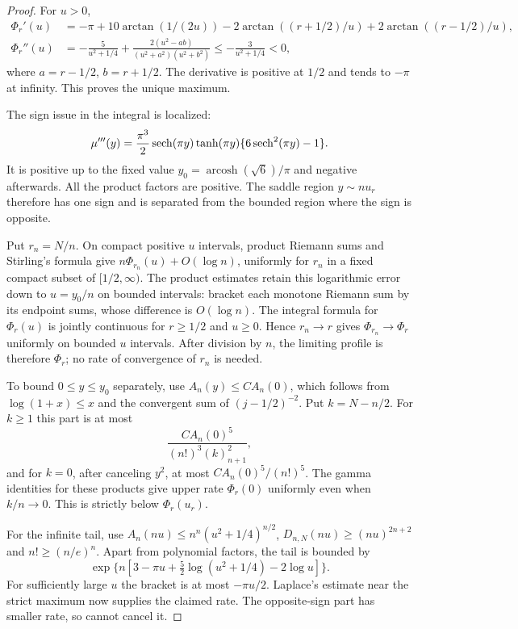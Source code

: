 \begin{proof}
For $u>0$,
\begin{align*}
 \Phi_r'(u)&=-\pi+10\arctan(1/(2u))
             -2\arctan((r+1/2)/u)+2\arctan((r-1/2)/u),\\
 \Phi_r''(u)&=-\frac5{u^2+1/4}
       +\frac{2(u^2-ab)}{(u^2+a^2)(u^2+b^2)}
       \le-\frac3{u^2+1/4}<0,
\end{align*}
where $a=r-1/2$, $b=r+1/2$. The derivative is positive at $1/2$
and tends to $-\pi$ at infinity. This proves the unique maximum.

The sign issue in the integral is localized:
\[
 \mu'''(y)=\frac{\pi^3}{2}\operatorname{sech}(\pi y)\tanh(\pi y)
                         \{6\operatorname{sech}^2(\pi y)-1\}.
\]
It is positive up to the fixed value
$y_0=\operatorname{arcosh}(\sqrt6)/\pi$ and negative afterwards.
All the product factors are positive. The saddle region $y\sim nu_r$
therefore has one sign and is separated from the bounded region where
the sign is opposite.

Put $r_n=N/n$. On compact positive $u$ intervals, product Riemann
sums and Stirling's formula give $n\Phi_{r_n}(u)+O(\log n)$, uniformly
for $r_n$ in a fixed compact subset of $[1/2,\infty)$.
The product estimates retain this logarithmic error down to
$u=y_0/n$ on bounded intervals: bracket each
monotone Riemann sum by its endpoint sums, whose difference is
$O(\log n)$. The integral formula for $\Phi_r(u)$ is jointly continuous
for $r\ge1/2$ and $u\ge0$. Hence $r_n\to r$ gives
$\Phi_{r_n}\to\Phi_r$ uniformly on bounded $u$ intervals. After
division by $n$, the limiting profile is therefore $\Phi_r$;
no rate of convergence of $r_n$ is needed.

To bound $0\le y\le y_0$ separately, use
$A_n(y)\le C A_n(0)$, which follows from $\log(1+x)\le x$ and
the convergent sum of $(j-1/2)^{-2}$. Put $k=N-n/2$. For $k\ge1$
this part is at most
\[
 \frac{C A_n(0)^5}{(n!)^3(k)_{n+1}^2},
\]
and for $k=0$, after canceling $y^2$, at most $C A_n(0)^5/(n!)^5$.
The gamma identities for these products give upper rate $\Phi_r(0)$
uniformly even when $k/n\to0$. This is strictly below $\Phi_r(u_r)$.

For the infinite tail, use
$A_n(nu)\le n^n(u^2+1/4)^{n/2}$,
$D_{n,N}(nu)\ge(nu)^{2n+2}$ and $n!\ge(n/e)^n$.
Apart from polynomial factors, the tail is bounded by
\[
 \exp\{n[3-\pi u+\tfrac52\log(u^2+1/4)-2\log u]\}.
\]
For sufficiently large $u$ the bracket is at most $-\pi u/2$.
Laplace's estimate near the strict maximum now supplies the claimed
rate. The opposite-sign part has smaller rate, so cannot cancel it.
\end{proof}


